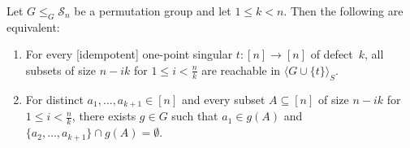 \begin{theorem}\label{thm:all-n-minus-k-sets-reachable}
	Let $G \le_G \mathcal S_n$ be a permutation group and let $1 \le k < n$.
	Then the following are equivalent:
	\begin{enumerate}
		\item
		For every [idempotent] one-point singular
		$t \colon [n] \to [n]$ of defect~$k$,
		all subsets of size $n-ik$ for
		$1 \le i < \frac{n}{k}$ are reachable in
		$\langle G \cup \{t\} \rangle_S$.
		
		\item
		For distinct
		$a_1,\ldots,a_{k+1}\in[n]$
		and every subset $A\subseteq[n]$ of size
		$n-ik$ for $1 \le i < \frac{n}{k}$,
		there exists $g\in G$ such that
		$a_1\in g(A)$ and
		$\{a_2,\ldots,a_{k+1}\}\cap g(A)=\emptyset$.
	\end{enumerate}
\end{theorem}

